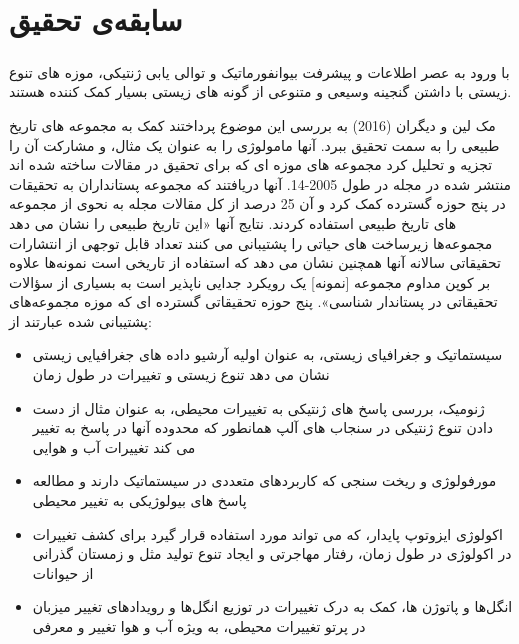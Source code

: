 
\chapter{سابقه‌ی تحقیق} \label{chapter:related-works}

\paragraph*{}

با ورود به عصر اطلاعات و پیشرفت بیوانفورماتیک و توالی یابی ژنتیکی، موزه های تنوع زیستی با داشتن گنجینه وسیعی و متنوعی از گونه های زیستی بسیار کمک کننده هستند.

مک لین و دیگران (2016) به بررسی این موضوع پرداختند کمک به مجموعه های تاریخ طبیعی را به سمت تحقیق ببرد. آنها مامولوژی را به عنوان یک مثال، و مشارکت آن را تجزیه و تحلیل کرد مجموعه های موزه ای که برای تحقیق در مقالات ساخته شده اند منتشر شده در مجله  در طول 2005-14. آنها دریافتند که مجموعه پستانداران به تحقیقات در پنج حوزه گسترده کمک کرد و آن 25 درصد از کل مقالات مجله  به نحوی از مجموعه های تاریخ طبیعی استفاده کردند. نتایج آنها «این تاریخ طبیعی را نشان می دهد مجموعه‌ها زیرساخت های حیاتی را پشتیبانی می کنند تعداد قابل توجهی از انتشارات تحقیقاتی سالانه آنها همچنین نشان می دهد که استفاده از تاریخی است نمونه‌ها علاوه بر کوپن مداوم مجموعه [نمونه] یک رویکرد جدایی ناپذیر است به بسیاری از سؤالات تحقیقاتی در پستاندار شناسی».
پنج حوزه تحقیقاتی گسترده ای که موزه مجموعه‌های پشتیبانی شده عبارتند از: 
\begin{itemize}
    \item     سیستماتیک و جغرافیای زیستی، به عنوان اولیه آرشیو داده های جغرافیایی زیستی نشان می دهد تنوع زیستی و تغییرات در طول زمان
    \item    ژنومیک، بررسی پاسخ های ژنتیکی به تغییرات محیطی، به عنوان مثال از دست دادن تنوع ژنتیکی در سنجاب های آلپ همانطور که محدوده آنها در پاسخ به تغییر می کند تغییرات آب و هوایی 
    \item    مورفولوژی و ریخت سنجی که کاربردهای متعددی در سیستماتیک دارند و مطالعه پاسخ های بیولوژیکی به تغییر محیطی
    \item    اکولوژی ایزوتوپ پایدار، که می تواند مورد استفاده قرار گیرد برای کشف تغییرات در اکولوژی در طول زمان، رفتار مهاجرتی و ایجاد تنوع تولید مثل و زمستان گذرانی از حیوانات 
    \item    انگل‌ها و پاتوژن ها، کمک به درک تغییرات در توزیع انگل‌ها و رویدادهای تغییر میزبان در پرتو تغییرات محیطی، به ویژه آب و هوا تغییر و معرفی
\end{itemize}

